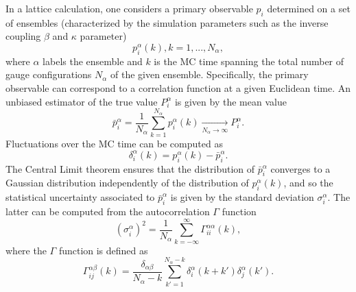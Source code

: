 In a lattice calculation, one considers a primary observable $p_i$ determined on a set of ensembles (characterized by the simulation parameters such as the inverse coupling $\beta$ and $\kappa$ parameter) 
\begin{equation}
p_i^{\alpha}(k), k=1,...,N_{\alpha},
\end{equation}
where $\alpha$ labels the ensemble and $k$ is the MC time spanning the total number of gauge configurations $N_{\alpha}$ of the given ensemble. Specifically, the primary observable can correspond to  a correlation function at a given Euclidean time. An unbiased estimator of the true value $P_i^{\alpha}$ is given by the mean value
\begin{equation}
\bar{p}_i^{\alpha}=\frac{1}{N_{\alpha}}\sum_{k=1}^{N_{\alpha}}p_i^{\alpha}(k)\xrightarrow[N_{\alpha}\rightarrow\infty]{}P_i^{\alpha}.
\end{equation}
Fluctuations over the MC time can be computed as
\begin{equation}
\delta_i^{\alpha}(k)=p_i^{\alpha}(k)-\bar{p}_i^{\alpha}.
\end{equation}
The Central Limit theorem ensures that the distribution of $\bar{p}_i^{\alpha}$ converges to a Gaussian distribution independently of the distribution of $p_i^{\alpha}(k)$, and so the statistical uncertainty associated to $\bar{p}_i^{\alpha}$ is given by the standard deviation $\sigma_i^{\alpha}$. The latter can be computed from the autocorrelation $\Gamma$ function
\begin{equation}
(\sigma_i^{\alpha})^2=\frac{1}{N_{\alpha}}\sum_{k=-\infty}^{\infty}\Gamma_{ii}^{\alpha\alpha}(k),
\end{equation}
where the $\Gamma$ function is defined as
\begin{equation}
\Gamma_{ij}^{\alpha\beta}(k)=\frac{\delta_{\alpha\beta}}{N_{\alpha}-k}\sum_{k'=1}^{N_{\alpha}-k}\delta_i^{\alpha}(k+k')\delta_j^{\alpha}(k').
\end{equation}

